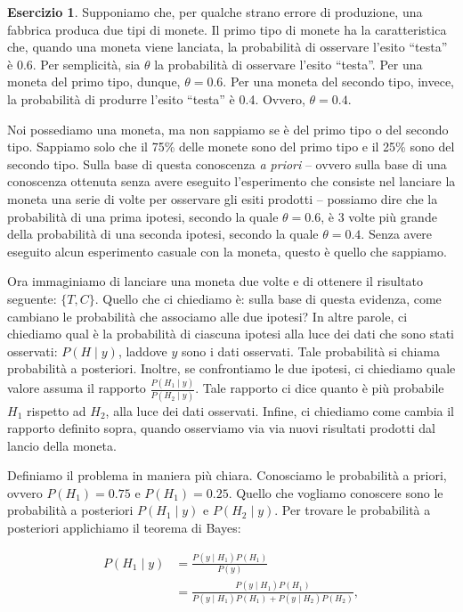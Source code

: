 \documentclass[
  11pt,
]{krantz}
\theoremstyle{definition}
\theoremstyle{definition}
\theoremstyle{definition}
\newtheorem{exercise}{Esercizio}[chapter]
\theoremstyle{definition}
\theoremstyle{remark}
\begin{document}
\begin{exercise}
Supponiamo che, per qualche strano errore di produzione, una fabbrica produca due tipi di monete. Il primo tipo di monete ha la caratteristica che, quando una moneta viene lanciata, la probabilità di osservare l'esito ``testa'' è 0.6. Per semplicità, sia \(\theta\) la probabilità di osservare l'esito ``testa''. Per una moneta del primo tipo, dunque, \(\theta = 0.6\). Per una moneta del secondo tipo, invece, la probabilità di produrre l'esito ``testa'' è 0.4. Ovvero, \(\theta = 0.4\).

Noi possediamo una moneta, ma non sappiamo se è del primo tipo o del secondo tipo. Sappiamo solo che il 75\% delle monete sono del primo tipo e il 25\% sono del secondo tipo. Sulla base di questa conoscenza \emph{a priori} -- ovvero sulla base di una conoscenza ottenuta senza avere eseguito l'esperimento che consiste nel lanciare la moneta una serie di volte per osservare gli esiti prodotti -- possiamo dire che la probabilità di una prima ipotesi, secondo la quale \(\theta = 0.6\), è 3 volte più grande della probabilità di una seconda ipotesi, secondo la quale \(\theta = 0.4\). Senza avere eseguito alcun esperimento casuale con la moneta, questo è quello che sappiamo.

Ora immaginiamo di lanciare una moneta due volte e di ottenere il risultato seguente: \(\{T, C\}\). Quello che ci chiediamo è: sulla base di questa evidenza, come cambiano le probabilità che associamo alle due ipotesi? In altre parole, ci chiediamo qual è la probabilità di ciascuna ipotesi alla luce dei dati che sono stati osservati: \(P(H \mid y)\), laddove \(y\) sono i dati osservati. Tale probabilità si chiama probabilità a posteriori. Inoltre, se confrontiamo le due ipotesi, ci chiediamo quale valore assuma il rapporto \(\frac{P(H_1 \mid y)}{P(H_2 \mid y)}\). Tale rapporto ci dice quanto è più probabile \(H_1\) rispetto ad \(H_2\), alla luce dei dati osservati. Infine, ci chiediamo come cambia il rapporto definito sopra, quando osserviamo via via nuovi risultati prodotti dal lancio della moneta.

Definiamo il problema in maniera più chiara. Conosciamo le probabilità a priori, ovvero \(P(H_1) = 0.75\) e \(P(H_1) = 0.25\). Quello che vogliamo conoscere sono le probabilità a posteriori \(P(H_1 \mid y)\) e \(P(H_2 \mid y)\). Per trovare le probabilità a posteriori applichiamo il teorema di Bayes:

\[
\begin{split}
P(H_1 \mid y) &= \frac{P(y \mid H_1) P(H_1)}{P(y)} \\
&= \frac{P(y \mid H_1) P(H_1)}{P(y \mid H_1) P(H_1) + P(y \mid H_2) P(H_2)},
\end{split}
\]


\end{exercise}
\end{document}

